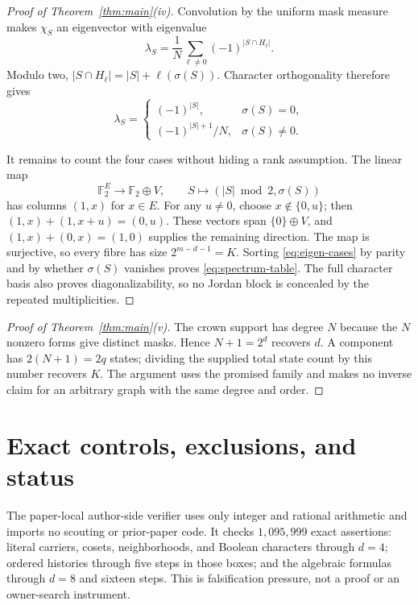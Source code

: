\documentclass[a4paper,10pt]{amsart}
\theoremstyle{remark}
\newcommand{\F}{\mathbb F}
\begin{document}
\begin{proof}[Proof of Theorem~\ref{thm:main}(iv)]
Convolution by the uniform mask measure makes $\chi_S$ an eigenvector with
eigenvalue
\begin{equation}\label{eq:eigen-character}
 \lambda_S=\frac1N\sum_{\ell\ne0}(-1)^{|S\cap H_\ell|}.
\end{equation}
Modulo two,
$|S\cap H_\ell|=|S|+\ell(\sigma(S))$.  Character orthogonality therefore
gives
\begin{equation}\label{eq:eigen-cases}
 \lambda_S=\begin{cases}
 (-1)^{|S|},&\sigma(S)=0,\\
 (-1)^{|S|+1}/N,&\sigma(S)\ne0.
 \end{cases}
\end{equation}

It remains to count the four cases without hiding a rank assumption.  The
linear map
\begin{equation}\label{eq:parity-sum-map}
 \F_2^E\longrightarrow\F_2\oplus V,\qquad
 S\longmapsto (|S|\bmod2,\sigma(S))
\end{equation}
has columns $(1,x)$ for $x\in E$.  For any $u\ne0$, choose
$x\notin\{0,u\}$; then $(1,x)+(1,x+u)=(0,u)$.  These vectors span
$\{0\}\oplus V$, and $(1,x)+(0,x)=(1,0)$ supplies the remaining direction.
The map is surjective, so every fibre has size
$2^{m-d-1}=K$.  Sorting \eqref{eq:eigen-cases} by parity and by whether
$\sigma(S)$ vanishes proves \eqref{eq:spectrum-table}.  The full character
basis also proves diagonalizability, so no Jordan block is concealed by the
repeated multiplicities.
\end{proof}

\begin{proof}[Proof of Theorem~\ref{thm:main}(v)]
The crown support has degree $N$ because the $N$ nonzero forms give distinct
masks.  Hence $N+1=2^d$ recovers $d$.  A component has $2(N+1)=2q$ states;
dividing the supplied total state count by this number recovers $K$.  The
argument uses the promised family and makes no inverse claim for an arbitrary
graph with the same degree and order.
\end{proof}

\section{Exact controls, exclusions, and status}

The paper-local author-side verifier uses only integer and rational arithmetic
and imports no scouting or prior-paper code.  It checks $1{,}095{,}999$ exact
assertions: literal carriers, cosets, neighborhoods, and Boolean characters
through $d=4$; ordered histories through five steps in those boxes; and the
algebraic formulas through $d=8$ and sixteen steps.  This is falsification
pressure, not a proof or an owner-search instrument.
\end{document}
